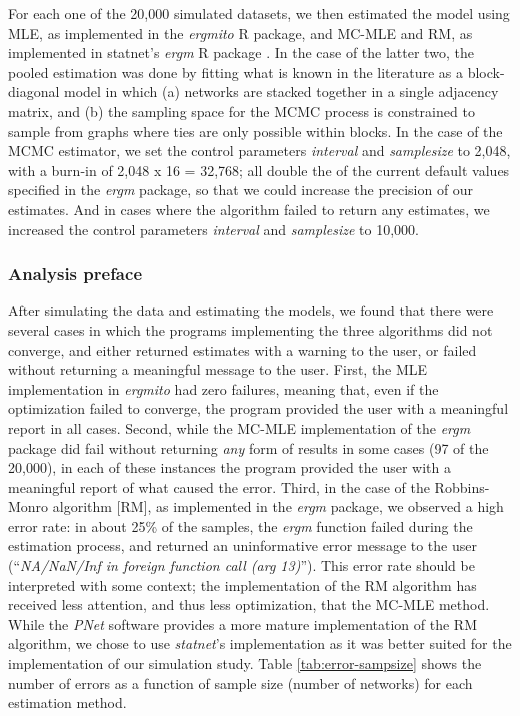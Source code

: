 \documentclass[review, nonatbib,doubleblind]{elsarticle/elsarticle}
\begin{document}
For each one of the 20,000 simulated datasets, we then estimated the model using MLE, as implemented in the \textit{ergmito} R package, %
and MC-MLE and RM, as implemented in statnet's \textit{ergm} R package \cite{Handcock2018,hunter2008}. In the case of the latter two, the pooled estimation was done by fitting what is known in the literature as a block-diagonal model in which (a) networks are stacked together in a single adjacency matrix, and (b) the sampling space for the MCMC process is constrained to sample from graphs where ties are only possible within blocks. In the case of the MCMC estimator, we set the control parameters \textit{interval} and \textit{samplesize} to 2,048, with a burn-in of 2,048 x 16 = 32,768; all double the of the current default values specified in the \textit{ergm} package, so that we could increase the precision of our estimates. And in  cases where the algorithm failed to return any estimates, we increased the control parameters \textit{interval} and \textit{samplesize} to 10,000.

\subsubsection{Analysis preface}

After simulating the data and estimating the models, we found that there were several cases in which the programs implementing the three algorithms did not converge, and either returned estimates with a warning to the user, or failed without returning a meaningful message to the user. First, the MLE implementation in \textit{ergmito} had zero failures, meaning that, even if the optimization failed to converge, the program provided the user with a meaningful report in all cases. Second, while the MC-MLE implementation of the \textit{ergm} package did fail without returning \textit{any} form of results in some cases (97 of the 20,000), in each of these instances the program provided the user with a meaningful report of what caused the error. Third, in the case of the Robbins-Monro algorithm [RM], as implemented in the \textit{ergm} package, we observed a high error rate: in about 25\% of the samples, the \textit{ergm} function failed during the estimation process, and returned an uninformative error message to the user (``\textit{NA/NaN/Inf in foreign function call (arg 13)}''). This error rate should be interpreted with some context; the implementation of the RM algorithm has received less attention, and thus less optimization, that the MC-MLE method. While the \textit{PNet} \cite{wang2006pnet} software provides a more mature implementation of the RM algorithm, we chose to use \textit{statnet}'s implementation as it was better suited for the implementation of our simulation study.
Table \ref{tab:error-sampsize} shows the number of errors as a function of sample size (number of networks) for each estimation method.
\end{document}
